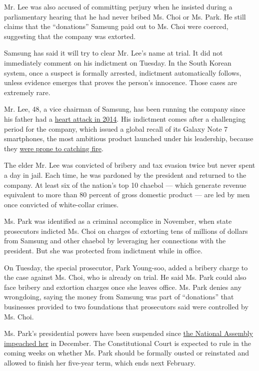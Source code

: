 Mr. Lee was also accused of committing perjury when he insisted during a
parliamentary hearing that he had never bribed Ms. Choi or Ms. Park. He
still claims that the ``donations'' Samsung paid out to Ms. Choi were
coerced, suggesting that the company was extorted.

Samsung has said it will try to clear Mr. Lee's name at trial. It did
not immediately comment on his indictment on Tuesday. In the South
Korean system, once a suspect is formally arrested, indictment
automatically follows, unless evidence emerges that proves the person's
innocence. Those cases are extremely rare.

Mr. Lee, 48, a vice chairman of Samsung, has been running the company
since his father had a
\href{https://www.nytimes3xbfgragh.onion/2014/05/12/business/international/samsungs-chairman-has-surgery-after-heart-attack.html}{heart
attack in 2014}. His indictment comes after a challenging period for the
company, which issued a global recall of its Galaxy Note 7 smartphones,
the most ambitious product launched under his leadership, because they
\href{https://www.nytimes3xbfgragh.onion/2016/09/03/business/samsung-galaxy-note-battery.html}{were
prone to catching fire}.

The elder Mr. Lee was convicted of bribery and tax evasion twice but
never spent a day in jail. Each time, he was pardoned by the president
and returned to the company. At least six of the nation's top 10 chaebol
--- which generate revenue equivalent to more than 80 percent of gross
domestic product --- are led by men once convicted of white-collar
crimes.

Ms. Park was identified as a criminal accomplice in November, when state
prosecutors indicted Ms. Choi on charges of extorting tens of millions
of dollars from Samsung and other chaebol by leveraging her connections
with the president. But she was protected from indictment while in
office.

On Tuesday, the special prosecutor, Park Young-soo, added a bribery
charge to the case against Ms. Choi, who is already on trial. He said
Ms. Park could also face bribery and extortion charges once she leaves
office. Ms. Park denies any wrongdoing, saying the money from Samsung
was part of ``donations'' that businesses provided to two foundations
that prosecutors said were controlled by Ms. Choi.

Ms. Park's presidential powers have been suspended since
\href{https://www.nytimes3xbfgragh.onion/2016/12/09/world/asia/south-korea-president-park-geun-hye-impeached.html}{the
National Assembly impeached her} in December. The Constitutional Court
is expected to rule in the coming weeks on whether Ms. Park should be
formally ousted or reinstated and allowed to finish her five-year term,
which ends next February.

